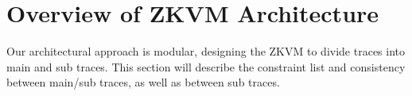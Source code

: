 \section{Overview of ZKVM Architecture} \label{sec:overview-of-zkvm-architecture}

Our architectural approach is modular, designing the ZKVM to divide traces into main and sub traces. This section will describe the constraint list and consistency between main/sub traces, as well as between sub traces.




